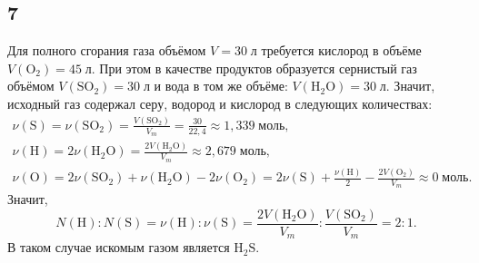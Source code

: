 \subsection{7}

Для полного сгорания газа объёмом $V=30\;\text{л}$ требуется кислород в объёме $V(\mathrm{O_2})=45\;\text{л}$. При этом в качестве продуктов образуется сернистый газ объёмом $V(\mathrm{SO_2})=30\;\text{л}$ и вода в том же объёме: $V(\mathrm{H_2O})=30\;\text{л}$. Значит, исходный газ содержал серу, водород и кислород в следующих количествах:
\begin{gather*}
\nu(\mathrm{S})=\nu(\mathrm{SO_2})=\frac{V(\mathrm{SO_2})}{V_m}=\frac{30}{22{,}4}\approx1{,}339\;\text{моль}, \\
\nu(\mathrm{H})=2\nu(\mathrm{H_2O})=\frac{2V(\mathrm{H_2O})}{V_m}\approx2{,}679\;\text{моль}, \\
\nu(\mathrm{O})=2\nu(\mathrm{SO_2})+\nu(\mathrm{H_2O})-2\nu(\mathrm{O_2})=2\nu(\mathrm{S})+\frac{\nu(\mathrm{H})}{2}-\frac{2V(\mathrm{O_2})}{V_m}\approx0\;\text{моль}.
\end{gather*}
Значит,
\[
N(\mathrm{H}):N(\mathrm{S})=\nu(\mathrm{H}):\nu(\mathrm{S})=\frac{2V(\mathrm{H_2O})}{V_m}:\frac{V(\mathrm{SO_2})}{V_m}=2:1.
\]
В таком случае искомым газом является $\mathrm{H_2S}$.